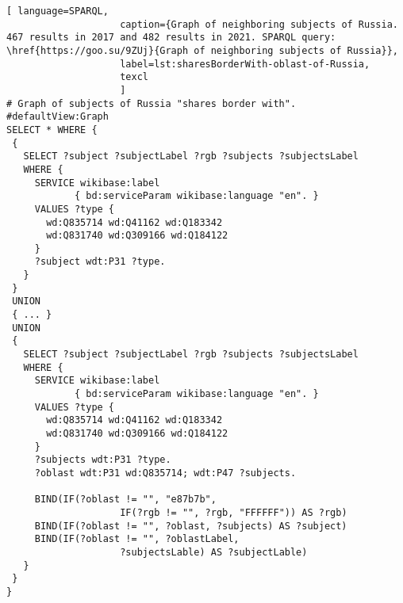 \lstset{numbers=left, firstnumber=1, frame=single}
\begin{lstlisting}[ language=SPARQL, 
                    caption={Graph of neighboring subjects of Russia. 467 results in 2017 and 482 results in 2021. SPARQL query: \href{https://goo.su/9ZUj}{Graph of neighboring subjects of Russia}},
                    label=lst:sharesBorderWith-oblast-of-Russia,
                    texcl 
                    ]
# Graph of subjects of Russia "shares border with". 
#defaultView:Graph
SELECT * WHERE {
 {
   SELECT ?subject ?subjectLabel ?rgb ?subjects ?subjectsLabel 
   WHERE {
     SERVICE wikibase:label 
            { bd:serviceParam wikibase:language "en". }
     VALUES ?type {
       wd:Q835714 wd:Q41162 wd:Q183342
       wd:Q831740 wd:Q309166 wd:Q184122
     }
     ?subject wdt:P31 ?type.
   }
 }
 UNION
 { ... }
 UNION
 {
   SELECT ?subject ?subjectLabel ?rgb ?subjects ?subjectsLabel 
   WHERE {
     SERVICE wikibase:label 
            { bd:serviceParam wikibase:language "en". }
     VALUES ?type {
       wd:Q835714 wd:Q41162 wd:Q183342
       wd:Q831740 wd:Q309166 wd:Q184122
     }
     ?subjects wdt:P31 ?type.
     ?oblast wdt:P31 wd:Q835714; wdt:P47 ?subjects.
     
     BIND(IF(?oblast != "", "e87b7b", 
                    IF(?rgb != "", ?rgb, "FFFFFF")) AS ?rgb)
     BIND(IF(?oblast != "", ?oblast, ?subjects) AS ?subject)
     BIND(IF(?oblast != "", ?oblastLabel, 
                    ?subjectsLable) AS ?subjectLable)
   }
 }
}
\end{lstlisting}%

\label{question:q_subjects_of_Russia_1}

